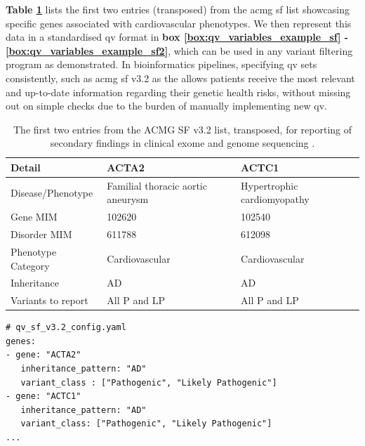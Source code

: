 \textbf{Table \ref{tab:transposed_acmg_sf_list}} lists the first two entries (transposed) from the \ac{acmg} \ac{sf} list showcasing specific genes associated with cardiovascular phenotypes.
We then represent this data in a standardised \ac{qv} format in
\textbf{box
\ref{box:qv_variables_example_sf} - 
\ref{box:qv_variables_example_sf2}},
which can be used in any variant filtering program as demonstrated.
In bioinformatics pipelines, specifying \ac{qv} sets consistently, such as \ac{acmg} \ac{sf} v3.2 as the allows patients receive the most relevant and up-to-date information regarding their genetic health risks, without missing out on simple checks due to the burden of manually implementing new \ac{qv}. 

\begin{table}[ht]
\centering
\caption{The first two entries from the ACMG SF v3.2 list, transposed, for reporting of secondary findings in clinical exome and genome sequencing \cite{miller2023acmg}.}
\begin{tabular}{@{}lp{4.5cm}p{4.5cm}@{}}
\toprule
\textbf{Detail}             & \textbf{ACTA2}                      & \textbf{ACTC1} \\
\midrule
Disease/Phenotype           & Familial thoracic aortic aneurysm   & Hypertrophic cardiomyopathy \\
Gene MIM                    & 102620                              & 102540 \\
Disorder MIM                & 611788                              & 612098 \\
Phenotype Category          & Cardiovascular                      & Cardiovascular \\
Inheritance                 & AD                                  & AD \\
Variants to report          & All P and LP                        & All P and LP \\
\bottomrule
\end{tabular}
\label{tab:transposed_acmg_sf_list}
\end{table}

\begin{tcolorbox}[
    breakable,  %
    colback=white!0,  %
    colframe=black,  %
    boxrule=1pt,  %
    arc=1mm,  %
    outer arc=1mm,
    title=\textbf{\refstepcounter{myboxcounter}\label{box:qv_variables_example_sf}Box \themyboxcounter: QV configuration for SF - YAML}
]
\begin{verbatim}
# qv_sf_v3.2_config.yaml
genes:
- gene: "ACTA2"
   inheritance_pattern: "AD"
   variant_class : ["Pathogenic", "Likely Pathogenic"]
- gene: "ACTC1"
   inheritance_pattern: "AD"
   variant_class: ["Pathogenic", "Likely Pathogenic"]
...
\end{verbatim}
\end{tcolorbox}

